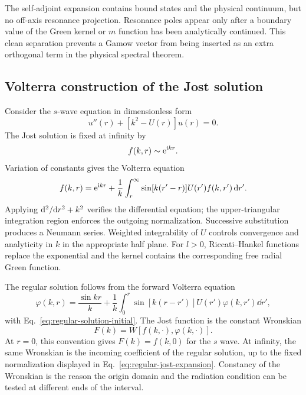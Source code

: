 The self-adjoint expansion contains bound states and the physical continuum,
but no off-axis resonance projection.  Resonance poles appear only after a
boundary value of the Green kernel or $m$ function has been analytically
continued.  This clean separation prevents a Gamow vector from being inserted
as an extra orthogonal term in the physical spectral theorem.

\subsection{Volterra construction of the Jost solution}
\label{subsec:jost-volterra}

Consider the $s$-wave equation in dimensionless form
\begin{equation}
  u''(r)+[k^2-U(r)]u(r)=0.
  \label{eq:s-wave-jost-equation}
\end{equation}
The Jost solution is fixed at infinity by
\begin{equation}
  f(k,r)\sim\mathrm{e}^{\mathrm{i} kr}.
  \label{eq:s-wave-jost-asymptotic}
\end{equation}
Variation of constants gives the Volterra equation
\begin{equation}
  f(k,r)
  =\mathrm{e}^{\mathrm{i} kr}
  +\frac{1}{k}\int_r^\infty
  \sin[k(r'-r)]U(r')f(k,r')\,\mathrm{d} r'.
  \label{eq:jost-volterra}
\end{equation}
Applying $\mathrm{d}^2/\mathrm{d} r^2+k^2$ verifies the differential equation; the
upper-triangular integration region enforces the outgoing normalization.
Successive substitution produces a Neumann series.  Weighted integrability
of $U$ controls convergence and analyticity in $k$ in the appropriate half
plane.  For $l>0$, Riccati--Hankel functions replace the exponential and the
kernel contains the corresponding free radial Green function.

The regular solution follows from the forward Volterra equation
\begin{equation}
  \varphi(k,r)
  =\frac{\sin kr}{k}
  +\frac{1}{k}\int_0^r
  \sin[k(r-r')]U(r')\varphi(k,r')\dd r',
  \label{eq:regular-volterra}
\end{equation}
with Eq.~\eqref{eq:regular-solution-initial}.  The Jost function is the
constant Wronskian
\begin{equation}
  F(k)=W[f(k,\cdot),\varphi(k,\cdot)].
  \label{eq:sl-jost-wronskian-definition}
\end{equation}
At $r=0$, this convention gives $F(k)=f(k,0)$ for the $s$ wave.  At infinity,
the same Wronskian is the incoming coefficient of the regular solution, up to
the fixed normalization displayed in
Eq.~\eqref{eq:regular-jost-expansion}.  Constancy of the Wronskian is the
reason the origin domain and the radiation condition can be tested at
different ends of the interval.

